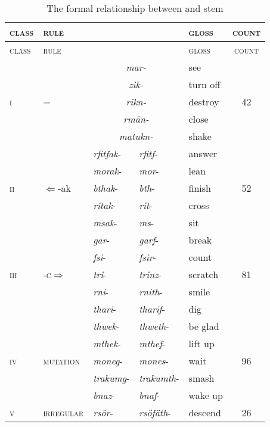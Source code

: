 \begin{longtable}{lllllc}
\caption{The formal relationship between \Ext{} and \Rs{} stem}
\label{frbearr}\\
	\lsptoprule
	\textsc{class}&\textsc{rule} &\Ext{} &\Rs{} &\textsc{gloss} &\textsc{count}\\\hline
	\endfirsthead
	\textsc{class}&\textsc{rule} &\Ext{} &\Rs{} &\textsc{gloss} &\textsc{count}\\\hline
	\endhead
	\multirow{5}{*}{\textsc{i}}	&\multirow{5}{*}{\Ext{}=\Rs{}} &\multicolumn{2}{c}{\emph{mar-}} &see &\multirow{5}{*}{\textsc{42}}\\
	&&\multicolumn{2}{c}{\emph{zik-}} &turn off &\\
	&&\multicolumn{2}{c}{\emph{rikn-}} &destroy &\\
	&&\multicolumn{2}{c}{\emph{rmän-}} &close &\\
	&&\multicolumn{2}{c}{\emph{matukn-}} &shake &\\\hline
	\multirow{5}{*}{\textsc{ii}} &\multirow{5}{*}{\Ext{}$\Leftarrow$\Rs-ak} &\emph{rfitfak}- &\emph{rfitf}- &answer &\multirow{5}{*}{\textsc{52}}\\
	&&\emph{morak}- &\emph{mor}- &lean &\\
	&&\emph{bthak}- &\emph{bth}- &finish &\\
	&&\emph{ritak}-	&\emph{rit}- &cross &\\
	&&\emph{msak}- &\emph{ms}-	&sit &\\\hline
	\multirow{5}{*}{\textsc{iii}} &\multirow{5}{*}{\Ext-\textsc{c}$\Rightarrow$\Rs} &\emph{gar}- &\emph{garf}- &break &\multirow{5}{*}{\textsc{81}}\\
	&&\emph{fsi}- &\emph{fsir}- &count &\\
	&&\emph{tri}- &\emph{trinz}- &scratch &\\
	&&\emph{rni}- &\emph{rnith}- &smile &\\
	&&\emph{thari}- &\emph{tharif}-	&dig &\\\hline
	\multirow{5}{*}{\textsc{iv}} &\multirow{5}{*}{\textsc{mutation}} &\emph{thwek}- &\emph{thweth}- &be glad &\multirow{5}{*}{\textsc{96}}\\
	&&\emph{mthek}- &\emph{mthef}- &lift up &\\
	&&\emph{moneg}-	&\emph{mones}- &wait &\\
	&&\emph{trakumg}- &\emph{trakumth}- &smash &\\
	&&\emph{bnaz}- &\emph{bnaf}- &wake up\\\hline
	\multirow{5}{*}{\textsc{v}}	&\multirow{5}{*}{\textsc{irregular}} &\emph{rsör}- &\emph{rsöfäth}- & descend &\multirow{5}{*}{\textsc{26}}\\

\end{longtable}

